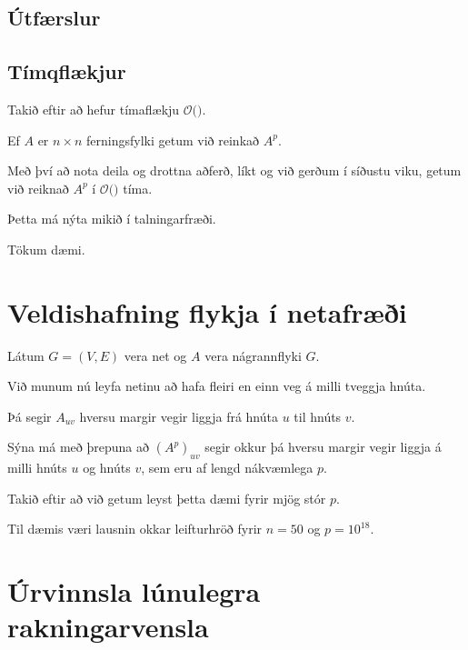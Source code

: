 \subsection{Útfærslur}
{
}

\subsection{Tímqflækjur}
{
    {
        \item<1-> Takið eftir að  hefur tímaflækju $\mathcal{O}($$)$.
        \item<3-> Ef $A$ er $n \times n$ ferningsfylki getum við reinkað $A^p$.
        \item<4-> Með því að nota deila og drottna aðferð, líkt og við gerðum í síðustu viku, getum við reiknað $A^p$ í
            $\mathcal{O}($$)$ tíma.
        \item<6-> Þetta má nýta mikið í talningarfræði.
        \item<7-> Tökum dæmi.
    }
}

\section{Veldishafning flykja í netafræði}
{
    {
        \item<1-> Látum $G = (V, E)$ vera net og $A$ vera nágrannflyki $G$.
        \item<2-> Við munum nú leyfa netinu að hafa fleiri en einn veg á milli tveggja hnúta.
        \item<3-> Þá segir $A_{uv}$ hversu margir vegir liggja frá hnúta $u$ til hnúts $v$.
        \item<4-> Sýna má með þrepuna að $(A^p)_{uv}$ segir okkur þá hversu margir vegir liggja á milli hnúts $u$ og hnúts $v$,
                sem eru af lengd nákvæmlega $p$.
        \item<5-> Takið eftir að við getum leyst þetta dæmi fyrir mjög stór $p$.
        \item<6-> Til dæmis væri lausnin okkar leifturhröð fyrir $n = 50$ og $p = 10^{18}$.
    }
}

\section{Úrvinnsla lúnulegra rakningarvensla}
